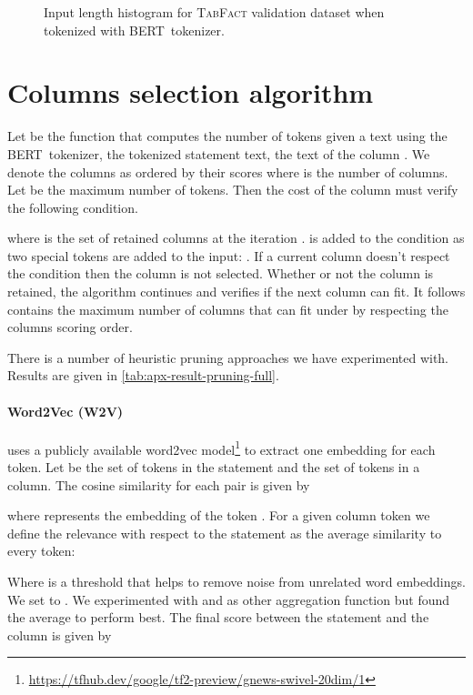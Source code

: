 \documentclass[11pt,a4paper]{article}
\newcommand{\tabfact}{\textsc{TabFact}\xspace}
\newcommand{\bert}{\textsc{BERT}\xspace}
\theoremstyle{definition}
\begin{document}
\begin{figure}[H]
    \caption{Input length histogram for \tabfact{} validation dataset when tokenized with \bert{}~tokenizer.}
    \label{fig:examples_distribution}
\end{figure}

\section{Columns selection algorithm}
\label{sec:apx-table-pruning-descr}

Let  be the function that computes the number of tokens given a text using the \bert{}~tokenizer,  the tokenized statement text,  the text of the column . We denote the columns as  ordered by their scores  where  is the number of columns. Let  be the maximum number of tokens. 
Then the cost of the column must verify the following condition.

where  is the set of retained columns at the iteration .  is added to the condition as two special tokens are added to the input: .
If a current column  doesn't respect the condition then the column is not selected. Whether or not the column is retained, the algorithm continues and verifies if the next column can fit. It follows  contains the maximum number of columns that can fit under  by respecting the columns scoring order.

There is a number of heuristic pruning approaches we have experimented with. Results are given in \ref{tab:apx-result-pruning-full}.

\paragraph{Word2Vec (W2V)} uses a publicly available word2vec \cite{mikolov-13} model\footnote{\url{https://tfhub.dev/google/tf2-preview/gnews-swivel-20dim/1}} to extract one embedding for each token. Let  be the set of tokens in the statement and  the set of tokens in a column. The cosine similarity for each pair is given by 

where  represents the embedding of the token .
For a given column token  we define the relevance with respect to the statement as the average similarity to every token:

Where  is a threshold that helps to remove noise from unrelated word embeddings. We set  to .
We experimented with  and  as other aggregation function but found the average to perform best.
The final score between the statement  and the column  is given by 
\end{document}
